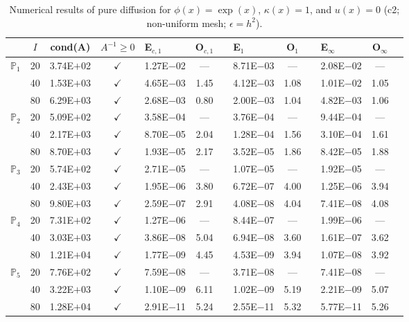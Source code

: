 \begin{table}[H]
\centering
\caption{Numerical results of pure diffusion for $\phi(x)=\exp(x)$, $\kappa(x)=1$, and $u(x)=0$ (c2; non-uniform mesh; $\epsilon=h^2$).}
\begin{tabular}{@{}l c c c l c c l c c l c c@{}}
\toprule
 & $I$ & cond(A) & $A^{-1}\geq 0$ &  E$_{c,1}$ & O$_{c,1}$ && E$_1$ & O$_1$ && E$_{\infty}$ & O$_{\infty}$\\
\midrule
\multirow{3}{*}{$\mathbb{P}_{1}$}
 & 20 & 3.74E$+$02 & $\checkmark$ & 1.27E$-$02 & --- && 8.71E$-$03 & --- && 2.08E$-$02 & ---\\
 & 40 & 1.53E$+$03 & $\checkmark$ & 4.65E$-$03 & 1.45 && 4.12E$-$03 & 1.08 && 1.01E$-$02 & 1.05\\
 & 80 & 6.29E$+$03 & $\checkmark$ & 2.68E$-$03 & 0.80 && 2.00E$-$03 & 1.04 && 4.82E$-$03 & 1.06\\
\midrule
\multirow{3}{*}{$\mathbb{P}_{2}$}
 & 20 & 5.09E$+$02 & $\checkmark$ & 3.58E$-$04 & --- && 3.76E$-$04 & --- && 9.44E$-$04 & ---\\
 & 40 & 2.17E$+$03 & $\checkmark$ & 8.70E$-$05 & 2.04 && 1.28E$-$04 & 1.56 && 3.10E$-$04 & 1.61\\
 & 80 & 8.70E$+$03 & $\checkmark$ & 1.93E$-$05 & 2.17 && 3.52E$-$05 & 1.86 && 8.42E$-$05 & 1.88\\
\midrule
\multirow{3}{*}{$\mathbb{P}_{3}$}
 & 20 & 5.74E$+$02 & $\checkmark$ & 2.71E$-$05 & --- && 1.07E$-$05 & --- && 1.92E$-$05 & ---\\
 & 40 & 2.43E$+$03 & $\checkmark$ & 1.95E$-$06 & 3.80 && 6.72E$-$07 & 4.00 && 1.25E$-$06 & 3.94\\
 & 80 & 9.80E$+$03 & $\checkmark$ & 2.59E$-$07 & 2.91 && 4.08E$-$08 & 4.04 && 7.41E$-$08 & 4.08\\
\midrule
\multirow{3}{*}{$\mathbb{P}_{4}$}
 & 20 & 7.31E$+$02 & $\checkmark$ & 1.27E$-$06 & --- && 8.44E$-$07 & --- && 1.99E$-$06 & ---\\
 & 40 & 3.03E$+$03 & $\checkmark$ & 3.86E$-$08 & 5.04 && 6.94E$-$08 & 3.60 && 1.61E$-$07 & 3.62\\
 & 80 & 1.21E$+$04 & $\checkmark$ & 1.77E$-$09 & 4.45 && 4.53E$-$09 & 3.94 && 1.07E$-$08 & 3.92\\
\midrule
\multirow{3}{*}{$\mathbb{P}_{5}$}
 & 20 & 7.76E$+$02 & $\checkmark$ & 7.59E$-$08 & --- && 3.71E$-$08 & --- && 7.41E$-$08 & ---\\
 & 40 & 3.22E$+$03 & $\checkmark$ & 1.10E$-$09 & 6.11 && 1.02E$-$09 & 5.19 && 2.21E$-$09 & 5.07\\
 & 80 & 1.28E$+$04 & $\checkmark$ & 2.91E$-$11 & 5.24 && 2.55E$-$11 & 5.32 && 5.77E$-$11 & 5.26\\
\bottomrule
\end{tabular}
\end{table}